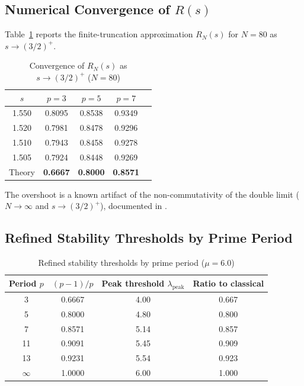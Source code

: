 \documentclass[12pt]{article}
\newcommand{\lpeak}{\lambda_{\mathrm{peak}}}
\begin{document}
\subsection{Numerical Convergence of $R(s)$}

Table~\ref{tab:convergence} reports the finite-truncation approximation 
$R_N(s)$ for $N=80$ as $s \to (3/2)^+$.

\begin{table}[h]
\centering
\caption{Convergence of $R_N(s)$ as $s \to (3/2)^+$ ($N = 80$)}
\label{tab:convergence}
\begin{tabular}{ccccc}
\toprule
$s$ & $p=3$ & $p=5$ & $p=7$ \\
\midrule
1.550 & 0.8095 & 0.8538 & 0.9349 \\
1.520 & 0.7981 & 0.8478 & 0.9296 \\
1.510 & 0.7943 & 0.8458 & 0.9278 \\
1.505 & 0.7924 & 0.8448 & 0.9269 \\
\midrule
Theory & \textbf{0.6667} & \textbf{0.8000} & \textbf{0.8571} \\
\bottomrule
\end{tabular}
\end{table}

The overshoot is a known artifact of the non-commutativity of the double 
limit ($N \to \infty$ and $s \to (3/2)^+$), documented in \citet{Moriwaki2026a}.

\subsection{Refined Stability Thresholds by Prime Period}

\begin{table}[h]
\centering
\caption{Refined stability thresholds by prime period ($\mu = 6.0$)}
\label{tab:thresholds}
\begin{tabular}{cccc}
\toprule
Period $p$ & $(p-1)/p$ & Peak threshold $\lpeak$ & Ratio to classical \\
\midrule
3  & 0.6667 & 4.00 & 0.667 \\
5  & 0.8000 & 4.80 & 0.800 \\
7  & 0.8571 & 5.14 & 0.857 \\
11 & 0.9091 & 5.45 & 0.909 \\
13 & 0.9231 & 5.54 & 0.923 \\
$\infty$ & 1.0000 & 6.00 & 1.000 \\
\bottomrule
\end{tabular}
\end{table}
\end{document}
